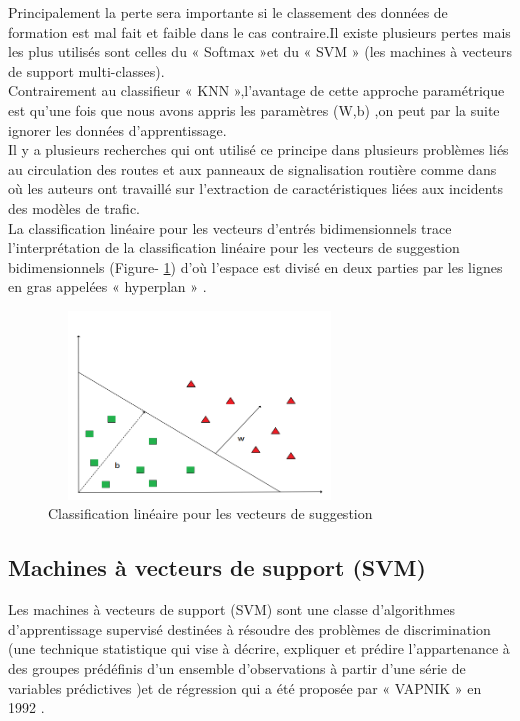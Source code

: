 \begin{enumerate}
Principalement la perte sera importante si le classement des données de formation est mal fait et faible dans le cas contraire.Il existe plusieurs pertes mais les plus utilisés sont celles du « Softmax »et du « SVM » (les machines à vecteurs de support multi-classes).\\

Contrairement au classifieur « KNN »,l’avantage de cette approche paramétrique est qu’une fois que nous avons appris les paramètres (W,b) ,on peut par la suite ignorer les données d’apprentissage.\\
Il y a plusieurs recherches qui ont utilisé ce principe dans plusieurs problèmes liés au circulation des routes et aux panneaux de signalisation routière comme dans \cite{30} où les auteurs ont travaillé sur l’extraction de caractéristiques liées aux incidents des modèles de trafic.\\

La classification linéaire pour les vecteurs d'entrés bidimensionnels trace l'interprétation de la classification linéaire pour les vecteurs de suggestion bidimensionnels (Figure- \ref{fig:trc}) d’où l'espace est divisé en deux parties par les lignes en gras appelées « hyperplan » \cite{31}.
\end{enumerate}

\begin{figure}[h!]
      \centering
      \includegraphics[width=8cm,height=5cm]{images/capt.png}
    \caption{Classification linéaire pour les vecteurs de suggestion}
    \label{fig:trc}
\end{figure}
\newpage
\subsection{Machines à vecteurs de support (SVM) }

Les machines à vecteurs de support (SVM) sont une classe d’algorithmes d'apprentissage supervisé destinées à résoudre des problèmes de discrimination (une technique statistique qui vise à décrire, expliquer et prédire l’appartenance à des groupes prédéfinis  d’un ensemble d’observations à partir d’une série de variables prédictives )et de régression qui a été proposée par « VAPNIK » en 1992 \cite{32}.\\

